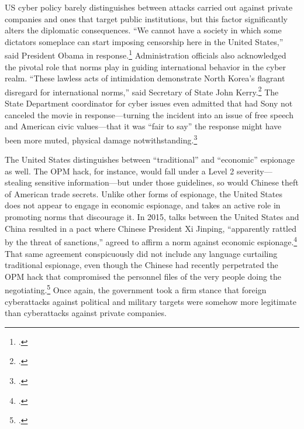\documentclass{memoir}
\begin{document}
\begin{refsegment}
US cyber policy barely distinguishes between attacks carried out against private companies and ones that target public institutions, but this factor significantly alters the diplomatic consequences. ``We cannot have a society in which some dictators someplace can start imposing censorship here in the United States,'' said President Obama in response.\footcite{perez_obama_2014} Administration officials also acknowledged the pivotal role that norms play in guiding international behavior in the cyber realm. ``These lawless acts of intimidation demonstrate North Korea's flagrant disregard for international norms,'' said Secretary of State John Kerry.\footcite{perez_obama_2014} The State Department coordinator for cyber issues even admitted that had Sony not canceled the movie in response---turning the incident into an issue of free speech and American civic values---that it was ``fair to say'' the response might have been more muted, physical damage notwithstanding.\footcite{nakashima_why_2015}


The United States distinguishes between ``traditional'' and ``economic'' espionage as well. The OPM hack, for instance, would fall under a Level 2 severity---stealing sensitive information---but under those guidelines, so would Chinese theft of American trade secrets. Unlike other forms of espionage, the United States does not appear to engage in economic espionage, and takes an active role in promoting norms that discourage it. In 2015, talks between the United States and China resulted in a pact where Chinese President Xi Jinping, ``apparently rattled by the threat of sanctions,'' agreed to affirm a norm against economic espionage.\footcite{nakashima_u.s._2015} That same agreement conspicuously did not include any language curtailing traditional espionage, even though the Chinese had recently perpetrated the OPM hack that compromised the personnel files of the very people doing the negotiating.\footcite{nakashima_u.s._2015} Once again, the government took a firm stance that foreign cyberattacks against political and military targets were somehow more legitimate than cyberattacks against private companies.


\end{refsegment}
\end{document}
